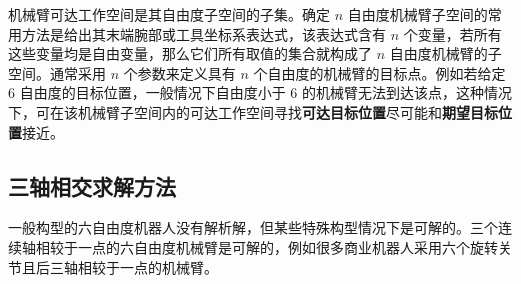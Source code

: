 \documentclass[cn,11pt,chinese,blue,bibstyle=ieeetr]{elegantbook}
\begin{document}
机械臂可达工作空间是其自由度子空间的子集。确定 $n$ 自由度机械臂子空间的常用方法是给出其末端腕部或工具坐标系表达式，该表达式含有 $n$ 个变量，若所有这些变量均是自由变量，那么它们所有取值的集合就构成了 $n$ 自由度机械臂的子空间。通常采用 $n$ 个参数来定义具有 $n$ 个自由度的机械臂的目标点。例如若给定 $6$ 自由度的目标位置，一般情况下自由度小于 $6$ 的机械臂无法到达该点，这种情况下，可在该机械臂子空间内的可达工作空间寻找\textbf{可达目标位置}尽可能和\textbf{期望目标位置}接近。


\subsection{三轴相交求解方法}

一般构型的六自由度机器人没有解析解，但某些特殊构型情况下是可解的。三个连续轴相较于一点的六自由度机械臂是可解的，例如很多商业机器人采用六个旋转关节且后三轴相较于一点的机械臂。
\end{document}
